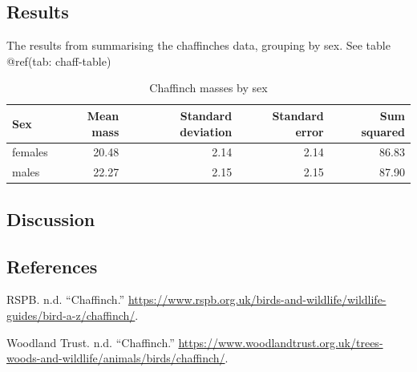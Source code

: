 \documentclass[
]{article}
\newenvironment{Shaded}{\begin{snugshade}}{\end{snugshade}}
\newcommand{\ControlFlowTok}[1]{\textcolor[rgb]{0.13,0.29,0.53}{\textbf{#1}}}
\newcommand{\DataTypeTok}[1]{\textcolor[rgb]{0.13,0.29,0.53}{#1}}
\newcommand{\DecValTok}[1]{\textcolor[rgb]{0.00,0.00,0.81}{#1}}
\newcommand{\KeywordTok}[1]{\textcolor[rgb]{0.13,0.29,0.53}{\textbf{#1}}}
\newcommand{\NormalTok}[1]{#1}
\newcommand{\OperatorTok}[1]{\textcolor[rgb]{0.81,0.36,0.00}{\textbf{#1}}}
\newcommand{\StringTok}[1]{\textcolor[rgb]{0.31,0.60,0.02}{#1}}
\begin{document}
\begin{Shaded}
\end{Shaded}

\hypertarget{results}{%
\subsection{Results}\label{results}}

The results from summarising the chaffinches data, grouping by sex. See table @ref(tab: chaff-table)

\begin{table}

\caption{\label{tab:chaff-table}Chaffinch masses by sex}
\centering
\begin{tabular}[t]{l|r|r|r|r}
\hline
Sex & Mean mass & Standard deviation & Standard error & Sum squared\\
\hline
females & 20.48 & 2.14 & 2.14 & 86.83\\
\hline
males & 22.27 & 2.15 & 2.15 & 87.90\\
\hline
\end{tabular}
\end{table}

\hypertarget{discussion}{%
\subsection{Discussion}\label{discussion}}

\hypertarget{references}{%
\subsection*{References}\label{references}}

\hypertarget{refs}{}
\leavevmode\hypertarget{ref-noauthor_undated-dy}{}%
RSPB. n.d. ``Chaffinch.'' \url{https://www.rspb.org.uk/birds-and-wildlife/wildlife-guides/bird-a-z/chaffinch/}.

\leavevmode\hypertarget{ref-Woodland_Trust_undated-gv}{}%
Woodland Trust. n.d. ``Chaffinch.'' \url{https://www.woodlandtrust.org.uk/trees-woods-and-wildlife/animals/birds/chaffinch/}.
\end{document}
